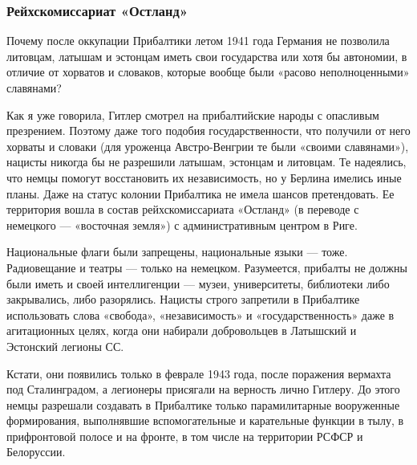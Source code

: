  
 
 
 
 
\clearpage
\subsubsection{Рейхскомиссариат «Остланд»}

Почему после оккупации Прибалтики летом 1941 года Германия не позволила
литовцам, латышам и эстонцам иметь свои государства или хотя бы автономии, в
отличие от хорватов и словаков, которые вообще были «расово неполноценными»
славянами?

Как я уже говорила, Гитлер смотрел на прибалтийские народы с опасливым
презрением. Поэтому даже того подобия государственности, что получили от него
хорваты и словаки (для уроженца Австро-Венгрии те были «своими славянами»),
нацисты никогда бы не разрешили латышам, эстонцам и литовцам. Те надеялись, что
немцы помогут восстановить их независимость, но у Берлина имелись иные планы.
Даже на статус колонии Прибалтика не имела шансов претендовать. Ее территория
вошла в состав рейхскомиссариата «Остланд» (в переводе с немецкого — «восточная
земля») с административным центром в Риге.

Национальные флаги были запрещены, национальные языки — тоже. Радиовещание и
театры — только на немецком. Разумеется, прибалты не должны были иметь и своей
интеллигенции — музеи, университеты, библиотеки либо закрывались, либо
разорялись. Нацисты строго запретили в Прибалтике использовать слова «свобода»,
«независимость» и «государственность» даже в агитационных целях, когда они
набирали добровольцев в Латышский и Эстонский легионы СС.

Кстати, они появились только в феврале 1943 года, после поражения вермахта под
Сталинградом, а легионеры присягали на верность лично Гитлеру. До этого немцы
разрешали создавать в Прибалтике только парамилитарные вооруженные
формирования, выполнявшие вспомогательные и карательные функции в тылу, в
прифронтовой полосе и на фронте, в том числе на территории РСФСР и Белоруссии.



